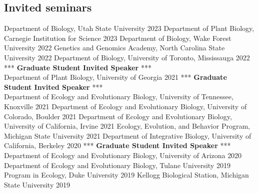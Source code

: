 \documentclass[11pt,english]{article}\usepackage[]{graphicx}\usepackage[]{xcolor}
\providecommand{\tabularnewline}{\\}
\begin{document}
\subsection*{Invited seminars}

Department of Biology, Utah State University \hfill{2023} \newline
Department of Plant Biology, Carnegie Institution for Science \hfill{2023} \newline
Department of Biology, Wake Forest University \hfill{2022} \newline
Genetics and Genomics Academy, North Carolina State University \hfill{2022} \newline
Department of Biology, University of Toronto, Mississauga \hfill{2022} \newline
\hspace{7mm} *** \textbf{Graduate Student Invited Speaker} *** \tabularnewline
Department of Plant Biology, University of Georgia \hfill{2021} \newline
\hspace{7mm} *** \textbf{Graduate Student Invited Speaker} *** \tabularnewline
Department of Ecology and Evolutionary Biology, University of Tennessee, Knoxville \hfill{2021} \newline
Department of Ecology and Evolutionary Biology, University of Colorado, Boulder \hfill{2021} \newline
Department of Ecology and Evolutionary Biology, University of California, Irvine \hfill{2021} \newline
Ecology, Evolution, and Behavior Program, Michigan State University \hfill{2021} \newline
Department of Integrative Biology, University of California, Berkeley \hfill{2020} \newline
\hspace{7mm} *** \textbf{Graduate Student Invited Speaker} *** \tabularnewline
Department of Ecology and Evolutionary Biology, University of Arizona \hfill{2020} \newline
Department of Ecology and Evolutionary Biology, Tulane University \hfill {2019} \newline
Program in Ecology, Duke University \hfill {2019}\newline
Kellogg Biological Station, Michigan State University \hfill {2019} \newline
\end{document}
